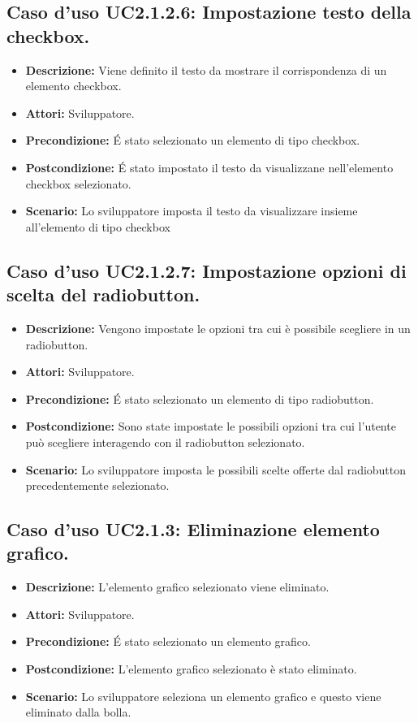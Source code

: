 \subsection{Caso d'uso UC2.1.2.6: Impostazione testo della checkbox.}
\begin{itemize}
\item[]\textbf{Descrizione:} Viene definito il testo da mostrare il corrispondenza di un elemento checkbox.
\item[]\textbf{Attori:} Sviluppatore. 
\item[]\textbf{Precondizione:} \'E stato selezionato un elemento di tipo checkbox. 
\item[]\textbf{Postcondizione:} \'E stato impostato il testo da visualizzane nell'elemento checkbox selezionato. 
\item[]\textbf{Scenario:}
Lo sviluppatore imposta il testo da visualizzare insieme all'elemento di tipo checkbox 
\end{itemize}

\subsection{Caso d'uso UC2.1.2.7: Impostazione opzioni di scelta del radiobutton.}
\begin{itemize}
\item[]\textbf{Descrizione:} Vengono impostate le opzioni tra cui è possibile scegliere in un radiobutton.
\item[]\textbf{Attori:} Sviluppatore. 
\item[]\textbf{Precondizione:} \'E stato selezionato un elemento di tipo radiobutton. 
\item[]\textbf{Postcondizione:} Sono state impostate le possibili opzioni tra cui l'utente può scegliere interagendo con il radiobutton selezionato. 
\item[]\textbf{Scenario:}
Lo sviluppatore imposta le possibili scelte offerte dal radiobutton precedentemente selezionato. 
\end{itemize}

\subsection{Caso d'uso UC2.1.3: Eliminazione elemento grafico.}
\begin{itemize}
\item[]\textbf{Descrizione:} L'elemento grafico selezionato viene eliminato.
\item[]\textbf{Attori:} Sviluppatore. 
\item[]\textbf{Precondizione:} \'E stato selezionato un elemento grafico. 
\item[]\textbf{Postcondizione:} L'elemento grafico selezionato è stato eliminato. 
\item[]\textbf{Scenario:}
Lo sviluppatore seleziona un elemento grafico e questo viene eliminato dalla bolla. 
\end{itemize}

